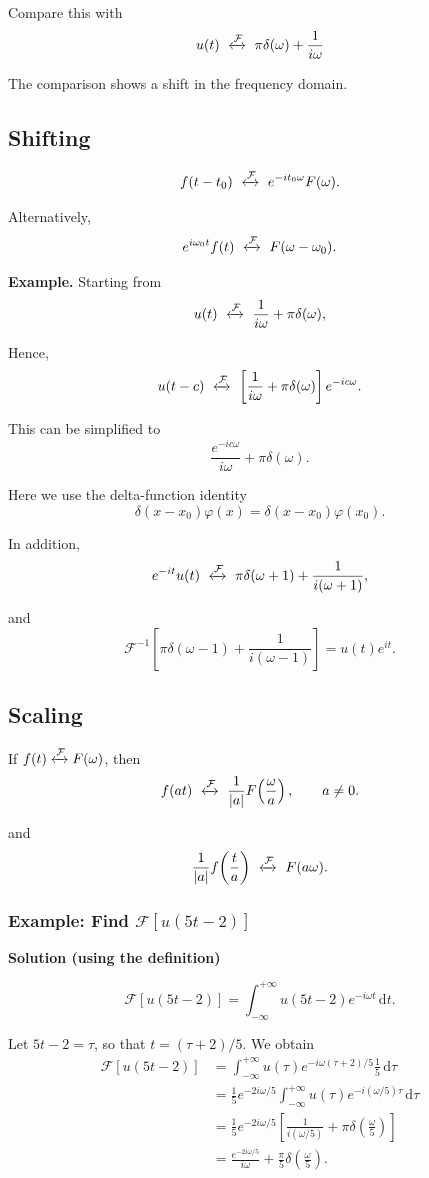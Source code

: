 \documentclass[11pt,a4paper]{article}
\theoremstyle{definition}
\theoremstyle{plain}
\begin{document}
Compare this with
\[
u(t)\ \xleftrightarrow{\mathcal F}\
\pi\delta(\omega)+\frac1{i\omega}
\]

The comparison shows a shift in the frequency domain.

\subsection{Shifting}
\[
f(t-t_0)
\ \xleftrightarrow{\mathcal F}\
e^{-it_0\omega}F(\omega).
\]

Alternatively,
\[
e^{i\omega_0t}f(t)
\ \xleftrightarrow{\mathcal F}\
F(\omega-\omega_0).
\]

\textbf{Example.} Starting from
\[
u(t)\ \xleftrightarrow{\mathcal F}\
\frac1{i\omega}+\pi\delta(\omega),
\]

Hence,
\[
u(t-c)\ \xleftrightarrow{\mathcal F}\
\left[\frac1{i\omega}+\pi\delta(\omega)\right]e^{-ic\omega}.
\]

This can be simplified to
\[
\frac{e^{-ic\omega}}{i\omega}+\pi\delta(\omega).
\]

Here we use the delta-function identity
\[
\delta(x-x_0)\varphi(x)
=\delta(x-x_0)\varphi(x_0).
\]

In addition,
\[
e^{-it}u(t)\ \xleftrightarrow{\mathcal F}\
\pi\delta(\omega+1)+\frac1{i(\omega+1)},
\]

and
\[
\mathcal F^{-1}\!\left[
\pi\delta(\omega-1)+\frac1{i(\omega-1)}
\right]
=u(t)e^{it}.
\]

\subsection{Scaling}

If \(f(t)\xleftrightarrow{\mathcal F}F(\omega)\), then
\[
f(at)\ \xleftrightarrow{\mathcal F}\
\frac1{|a|}F\!\left(\frac{\omega}{a}\right),
\qquad a\ne0.
\]

and
\[
\frac1{|a|}f\!\left(\frac{t}{a}\right)
\ \xleftrightarrow{\mathcal F}\
F(a\omega).
\]

\subsubsection*{Example: Find \(\mathcal F[u(5t-2)]\)}

\textbf{Solution (using the definition)}\par\nopagebreak[4]
\[
\mathcal F[u(5t-2)]
=\int_{-\infty}^{+\infty}
u(5t-2)e^{-i\omega t}\,\mathrm dt.
\]

Let \(5t-2=\tau\), so that \(t=(\tau+2)/5\). We obtain
\[
\begin{aligned}
\mathcal F[u(5t-2)]
&=\int_{-\infty}^{+\infty}
u(\tau)e^{-i\omega(\tau+2)/5}\frac15\,\mathrm d\tau\\
&=\frac15e^{-2i\omega/5}
\int_{-\infty}^{+\infty}
u(\tau)e^{-i(\omega/5)\tau}\,\mathrm d\tau\\
&=\frac15e^{-2i\omega/5}
\left[
\frac1{i(\omega/5)}+\pi\delta\!\left(\frac{\omega}{5}\right)
\right]\\
&=\frac{e^{-2i\omega/5}}{i\omega}
+\frac{\pi}{5}\delta\!\left(\frac{\omega}{5}\right).
\end{aligned}
\]
\end{document}
